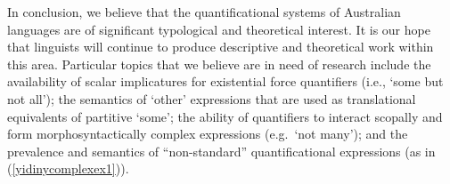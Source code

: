 \documentclass[12pt,egregdoesnotlikesansseriftitles]{scrartcl}
\begin{document}
In conclusion, we believe that the quantificational systems of Australian languages are of significant typological and theoretical interest. It is our hope that linguists will continue to produce descriptive and theoretical work within this area. Particular topics that we believe are in need of research include the availability of scalar implicatures for existential force quantifiers (i.e., `some but not all'); the semantics of `other' expressions that are used as translational equivalents of partitive `some'; the ability of quantifiers to interact scopally and form morphosyntactically complex expressions (e.g.\ `not many'); and the prevalence and semantics of ``non-standard'' quantificational expressions (as in (\ref{yidinycomplexex1})). 


\printbibliography
\end{document}
